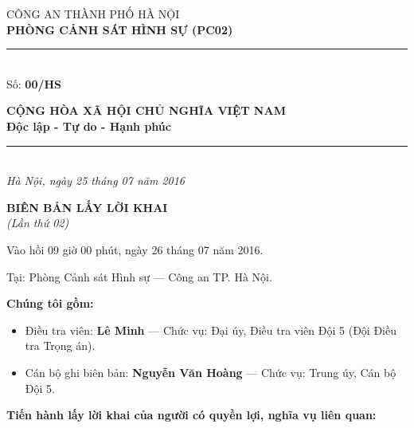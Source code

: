 \documentclass[12pt,a4paper]{article}
\begin{document}
\noindent
\begin{minipage}[t]{0.46\textwidth}
    \begin{center}
        \fontsize{11pt}{13pt}\selectfont
        CÔNG AN THÀNH PHỐ HÀ NỘI\\
        \textbf{PHÒNG CẢNH SÁT HÌNH SỰ (PC02)}\\[-0.2em]
        \rule{3.2cm}{0.6pt}\\[0.25cm]
        \fontsize{11pt}{13pt}\selectfont Số: \textbf{00/HS}
    \end{center}
\end{minipage}
\hfill
\begin{minipage}[t]{0.52\textwidth}
    \begin{center}
        \fontsize{11pt}{13pt}\selectfont
        \textbf{CỘNG HÒA XÃ HỘI CHỦ NGHĨA VIỆT NAM}\\
        \textbf{Độc lập - Tự do - Hạnh phúc}\\[-0.2em]
        \rule{3.6cm}{0.6pt}\\[0.25cm]
        \textit{Hà Nội, ngày 25 tháng 07 năm 2016}
    \end{center}
\end{minipage}

\vspace{0.5cm}

\begin{center}
    \textbf{\Large BIÊN BẢN LẤY LỜI KHAI}\\[0.15cm]
    \textit{(Lần thứ 02)}
\end{center}

\vspace{0.3cm}

Vào hồi 09 giờ 00 phút, ngày 26 tháng 07 năm 2016.

Tại: Phòng Cảnh sát Hình sự — Công an TP. Hà Nội.


\textbf{Chúng tôi gồm:}

\begin{itemize}[leftmargin=*, itemsep=2pt, topsep=2pt, parsep=0pt]
  \item Điều tra viên: \textbf{Lê Minh} — Chức vụ: Đại úy, Điều tra viên Đội 5 (Đội Điều tra Trọng án).
  \item Cán bộ ghi biên bản: \textbf{Nguyễn Văn Hoàng} — Chức vụ: Trung úy, Cán bộ Đội 5.

\end{itemize}
\textbf{Tiến hành lấy lời khai của người có quyền lợi, nghĩa vụ liên quan:}
\end{document}

